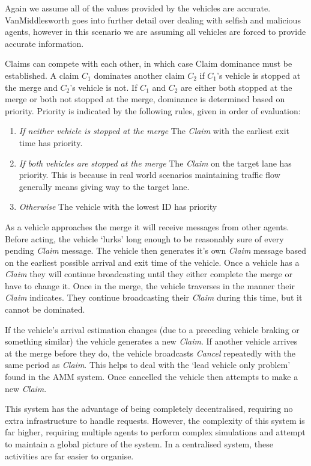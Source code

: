 Again we assume all of the values provided by the vehicles are accurate. VanMiddlesworth \citep{VanMiddlesworth2008} goes into further detail over dealing with selfish and malicious agents, however in this scenario we are assuming all vehicles are forced to provide accurate information.

Claims can compete with each other, in which case Claim dominance must be established. A claim $C_1$ dominates another claim $C_2$ if $C_1$'s vehicle is stopped at the merge and $C_2$'s vehicle is not. If $C_1$ and $C_2$ are either both stopped at the merge or both not stopped at the merge, dominance is determined based on priority. Priority is indicated by the following rules, given in order of evaluation:

\begin{enumerate}
\item \emph{If neither vehicle is stopped at the merge} The \emph{Claim} with the earliest exit time has priority.
\item \emph{If both vehicles are stopped at the merge} The \emph{Claim} on the target lane has priority. This is because in real world scenarios maintaining traffic flow generally means giving way to the target lane.
\item \emph{Otherwise} The vehicle with the lowest ID has priority
\end{enumerate}

As a vehicle approaches the merge it will receive messages from other agents. Before acting, the vehicle `lurks' long enough to be reasonably sure of every pending \emph{Claim} message. The vehicle then generates it's own \emph{Claim} message based on the earliest possible arrival and exit time of the vehicle. Once a vehicle has a \emph{Claim} they will continue broadcasting until they either complete the merge or have to change it. Once in the merge, the vehicle traverses in the manner their \emph{Claim} indicates. They continue broadcasting their \emph{Claim} during this time, but it cannot be dominated. 

If the vehicle's arrival estimation changes (due to a preceding vehicle braking or something similar) the vehicle generates a new \emph{Claim}. If another vehicle arrives at the merge before they do, the vehicle broadcasts \emph{Cancel} repeatedly with the same period as \emph{Claim}. This helps to deal with the `lead vehicle only problem' found in the AMM system. Once cancelled the vehicle then attempts to make a new \emph{Claim}.

This system has the advantage of being completely decentralised, requiring no extra infrastructure to handle requests. However, the complexity of this system is far higher, requiring multiple agents to perform complex simulations and attempt to maintain a global picture of the system. In a centralised system, these activities are far easier to organise.